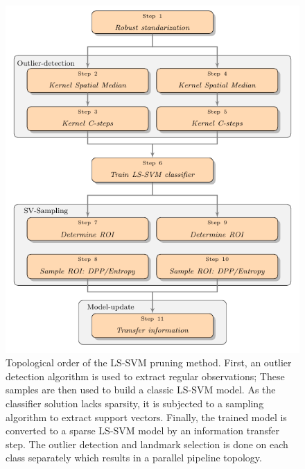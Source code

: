 \documentclass[preprint,12pt]{elsarticle}
\begin{document}
	\begin{figure}[!htb]
		\centering
		\label{fig:pipeline}
		\centering\includegraphics[width=0.8\linewidth]{flow/gabstract.pdf}
		\caption{Topological order of the LS-SVM pruning method. First, an outlier detection algorithm is used to extract regular observations; These samples are then used to build a classic LS-SVM model. As the classifier solution lacks sparsity, it is subjected to a sampling algorithm to extract support vectors. Finally, the trained model is converted to a sparse LS-SVM model by an information transfer step.  The outlier detection and landmark selection is done on each class separately which results in a parallel pipeline topology.} 
	\end{figure}
\end{document}

